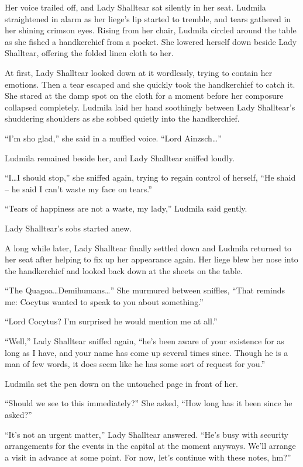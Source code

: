  

Her voice trailed off, and Lady Shalltear sat silently in her seat. Ludmila straightened in alarm as her liege’s lip started to tremble, and tears gathered in her shining crimson eyes. Rising from her chair, Ludmila circled around the table as she fished a handkerchief from a pocket. She lowered herself down beside Lady Shalltear, offering the folded linen cloth to her.

 

At first, Lady Shalltear looked down at it wordlessly, trying to contain her emotions. Then a tear escaped and she quickly took the handkerchief to catch it. She stared at the damp spot on the cloth for a moment before her composure collapsed completely. Ludmila laid her hand soothingly between Lady Shalltear’s shuddering shoulders as she sobbed quietly into the handkerchief.

 

“I’m sho glad,” she said in a muffled voice. “Lord Ainzsch…”

 

Ludmila remained beside her, and Lady Shalltear sniffed loudly.

 

“I…I should stop,” she sniffed again, trying to regain control of herself, “He shaid – he said I can’t waste my face on tears.”

 

“Tears of happiness are not a waste, my lady,” Ludmila said gently.

 

Lady Shalltear’s sobs started anew.

 

A long while later, Lady Shalltear finally settled down and Ludmila returned to her seat after helping to fix up her appearance again. Her liege blew her nose into the handkerchief and looked back down at the sheets on the table.

 

“The Quagoa…Demihumans…” She murmured between sniffles, “That reminds me: Cocytus wanted to speak to you about something.”

 

“Lord Cocytus? I’m surprised he would mention me at all.”

 

“Well,” Lady Shalltear sniffed again, “he’s been aware of your existence for as long as I have, and your name has come up several times since. Though he is a man of few words, it does seem like he has some sort of request for you.”

 

Ludmila set the pen down on the untouched page in front of her.

 

“Should we see to this immediately?” She asked, “How long has it been since he asked?”

 

“It’s not an urgent matter,” Lady Shalltear answered. “He’s busy with security arrangements for the events in the capital at the moment anyways. We’ll arrange a visit in advance at some point. For now, let’s continue with these notes, hm?”

